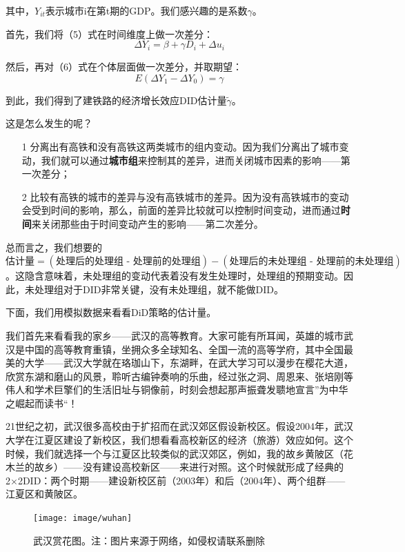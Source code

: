 \documentclass[cn,12pt,math=newtx,citestyle=gb7714-2015,bibstyle=gb7714-2015]{elegantbook}
\begin{document}
	其中，$Y_{it}$表示城市i在第t期的GDP。我们感兴趣的是系数$\gamma$。
	
	首先，我们将（5）式在时间维度上做一次差分：
	\begin{equation}
		\Delta{Y}_i=\beta+\gamma{D}_i+\Delta{u}_i
	\end{equation}
	
	然后，再对（6）式在个体层面做一次差分，并取期望：
	\begin{equation}
		E(\Delta{Y}_1-\Delta{Y}_0)=\gamma
	\end{equation}
	
	到此，我们得到了建铁路的经济增长效应DID估计量$\tilde{\gamma}$。
	
	这是怎么发生的呢？
	
	\begin{itemize}
		\item [1] 分离出有高铁和没有高铁这两类城市的组内变动。因为我们分离出了城市变动，我们就可以通过\textbf{城市组}来控制其的差异，进而关闭城市因素的影响——第一次差分；
		\item [2] 比较有高铁的城市的差异与没有高铁城市的差异。因为没有高铁城市的变动会受到时间的影响，那么，前面的差异比较就可以控制时间变动，进而通过\textbf{时间}来关闭那些由于时间变动产生的影响——第二次差分。
	\end{itemize}

    总而言之，我们想要的$\text{估计量} = (\text{处理后的处理组 - 处理前的处理组}) - (\text{处理后的未处理组 - 处理前的未处理组})$。这隐含意味着，未处理组的变动代表着没有发生处理时，处理组的预期变动。因此，未处理组对于DID非常关键，没有未处理组，就不能做DID。
    
    下面，我们用模拟数据来看看DiD策略的估计量。
    
    我们首先来看看我的家乡——武汉的高等教育。大家可能有所耳闻，英雄的城市武汉是中国的高等教育重镇，坐拥众多全球知名、全国一流的高等学府，其中全国最美的大学——武汉大学就在珞珈山下，东湖畔，在武大学习可以漫步在樱花大道，欣赏东湖和磨山的风景，聆听古编钟奏响的乐曲，经过张之洞、周恩来、张培刚等伟人和学术巨擎们的生活旧址与铜像前，时刻会想起那声振聋发聩地宣言”为中华之崛起而读书“！
    
    21世纪之初，武汉很多高校由于扩招而在武汉郊区假设新校区。假设2004年，武汉大学在江夏区建设了新校区，我们想看看高校新区的经济（旅游）效应如何。这个时候，我们就选择一个与江夏区比较类似的武汉郊区，例如，我的故乡黄陂区（花木兰的故乡）——没有建设高校新区——来进行对照。这个时候就形成了经典的2×2DID：两个时期——建设新校区前（2003年）和后（2004年）、两个组群——江夏区和黄陂区。
    
    \begin{figure}[tbph]
    	\centering
    	\texttt{[image: image/wuhan]}
    	\caption{武汉赏花图。注：图片来源于网络，如侵权请联系删除}
    	\label{fig:wuhan}
    \end{figure}
    
\end{document}
